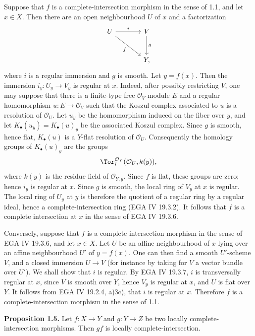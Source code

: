 Suppose that $f$ is a complete-intersection morphism in the sense of 1.1, and let $x\in X$. Then there are an open neighbourhood $U$ of $x$ and a factorization
\[
\begin{tikzcd}[column sep=large,row sep=large]
U \arrow[r,"i"] \arrow[dr,"f"'] & V \arrow[d,"g"]\\
& Y,
\end{tikzcd}
\]
where $i$ is a regular immersion and $g$ is smooth. Let $y=f(x)$. Then the immersion $i_y:U_y\to V_y$ is regular at $x$. Indeed, after possibly restricting $V$, one may suppose that there is a finite-type free $\mathcal O_V$-module $E$ and a regular homomorphism $u:E\to\mathcal O_V$ such that the Koszul complex associated to $u$ is a resolution of $\mathcal O_U$. Let $u_y$ be the homomorphism induced on the fiber over $y$, and let $K_\bullet(u_y)=K_\bullet(u)_y$ be the associated Koszul complex. Since $g$ is smooth, hence flat, $K_\bullet(u)$ is a $Y$-flat resolution of $\mathcal O_U$. Consequently the homology groups of $K_\bullet(u)_y$ are the groups
\[
\Tor_i^{\mathcal O_Y}(\mathcal O_U,k(y)),
\]
where $k(y)$ is the residue field of $\mathcal O_{Y,y}$. Since $f$ is flat, these groups are zero; hence $i_y$ is regular at $x$. Since $g$ is smooth, the local ring of $V_y$ at $x$ is regular. The local ring of $U_y$ at $y$ is therefore the quotient of a regular ring by a regular ideal, hence a complete-intersection ring (EGA IV 19.3.2). It follows that $f$ is a complete intersection at $x$ in the sense of EGA IV 19.3.6.

Conversely, suppose that $f$ is a complete-intersection morphism in the sense of EGA IV 19.3.6, and let $x\in X$. Let $U$ be an affine neighbourhood of $x$ lying over an affine neighbourhood $U'$ of $y=f(x)$. One can then find a smooth $U'$-scheme $V$, and a closed immersion $U\to V$ (for instance by taking for $V$ a vector bundle over $U'$). We shall show that $i$ is regular. By EGA IV 19.3.7, $i$ is transversally regular at $x$, since $V$ is smooth over $Y$, hence $V_y$ is regular at $x$, and $U$ is flat over $Y$. It follows from EGA IV 19.2.4, a)3c), that $i$ is regular at $x$. Therefore $f$ is a complete-intersection morphism in the sense of 1.1.

\textbf{Proposition 1.5.} Let $f:X\to Y$ and $g:Y\to Z$ be two locally complete-intersection morphisms. Then $gf$ is locally complete-intersection.

